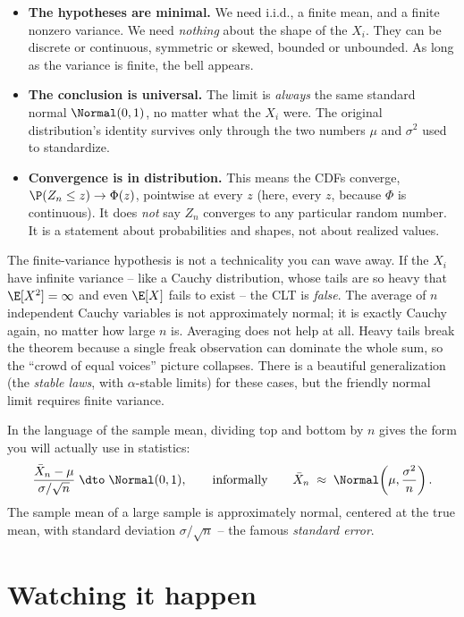\begin{itemize}
\item \textbf{The hypotheses are minimal.} We need i.i.d., a finite mean, and a finite
nonzero variance. We need \emph{nothing} about the shape of the $X_i$. They can be
discrete or continuous, symmetric or skewed, bounded or unbounded. As long as the
variance is finite, the bell appears.
\item \textbf{The conclusion is universal.} The limit is \emph{always} the same standard
normal $\Normal(0,1)$, no matter what the $X_i$ were. The original distribution's
identity survives only through the two numbers $\mu$ and $\sigma^2$ used to standardize.
\item \textbf{Convergence is in distribution.} This means the CDFs converge,
$\P(Z_n \le z) \to \Phi(z)$, pointwise at every $z$ (here, every $z$, because $\Phi$ is
continuous). It does \emph{not} say $Z_n$ converges to any particular random number. It
is a statement about probabilities and shapes, not about realized values.
\end{itemize}

\begin{trapbox}
The finite-variance hypothesis is not a technicality you can wave away. If the $X_i$ have
infinite variance -- like a Cauchy distribution, whose tails are so heavy that
$\E[X^2] = \infty$ and even $\E[X]$ fails to exist -- the CLT is \emph{false}. The
average of $n$ independent Cauchy variables is not approximately normal; it is exactly
Cauchy again, no matter how large $n$ is. Averaging does not help at all. Heavy tails
break the theorem because a single freak observation can dominate the whole sum, so the
``crowd of equal voices'' picture collapses. There is a beautiful generalization (the
\emph{stable laws}, with $\alpha$-stable limits) for these cases, but the friendly normal
limit requires finite variance.
\end{trapbox}

In the language of the sample mean, dividing top and bottom by $n$ gives the form you
will actually use in statistics:
\[
  \frac{\bar X_n - \mu}{\sigma/\sqrt{n}} \;\dto\; \Normal(0,1),
  \qquad \text{informally} \qquad
  \bar X_n \;\approx\; \Normal\!\left(\mu, \frac{\sigma^2}{n}\right).
\]
The sample mean of a large sample is approximately normal, centered at the true mean,
with standard deviation $\sigma/\sqrt{n}$ -- the famous \emph{standard error}.

\section{Watching it happen}
\label{ch21:simulation}

